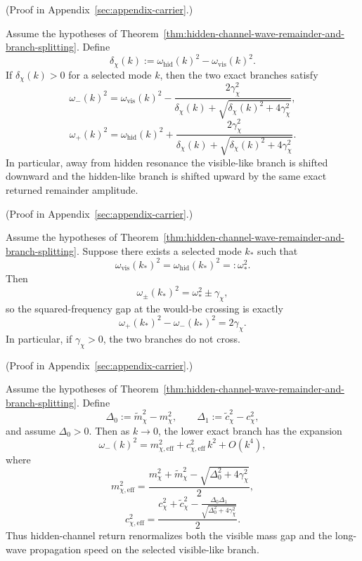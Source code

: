 (Proof in Appendix~\ref{sec:appendix-carrier}.)

\begin{corollary}
\label{cor:exact-off-resonant-hidden-channel-branch-shifts}
Assume the hypotheses of
Theorem~\ref{thm:hidden-channel-wave-remainder-and-branch-splitting}. Define
\[
\delta_{\chi}(k)
:=
\omega_{\mathrm{hid}}(k)^2-\omega_{\mathrm{vis}}(k)^2.
\]
If \(\delta_{\chi}(k)>0\) for a selected mode \(k\), then the two exact
branches satisfy
\[
\omega_-(k)^2
=
\omega_{\mathrm{vis}}(k)^2
-
\frac{2\gamma_{\chi}^2}{
\delta_{\chi}(k)+\sqrt{\delta_{\chi}(k)^2+4\gamma_{\chi}^2}
},
\]
\[
\omega_+(k)^2
=
\omega_{\mathrm{hid}}(k)^2
+
\frac{2\gamma_{\chi}^2}{
\delta_{\chi}(k)+\sqrt{\delta_{\chi}(k)^2+4\gamma_{\chi}^2}
}.
\]
In particular, away from hidden resonance the visible-like branch is shifted
downward and the hidden-like branch is shifted upward by the same exact
returned remainder amplitude.
\end{corollary}

(Proof in Appendix~\ref{sec:appendix-carrier}.)

\begin{corollary}
\label{cor:exact-avoided-crossing-coupled-wave-branches}
Assume the hypotheses of
Theorem~\ref{thm:hidden-channel-wave-remainder-and-branch-splitting}. Suppose
there exists a selected mode \(k_\ast\) such that
\[
\omega_{\mathrm{vis}}(k_\ast)^2
=
\omega_{\mathrm{hid}}(k_\ast)^2
=:
\omega_\ast^2.
\]
Then
\[
\omega_{\pm}(k_\ast)^2=\omega_\ast^2\pm\gamma_{\chi},
\]
so the squared-frequency gap at the would-be crossing is exactly
\[
\omega_+(k_\ast)^2-\omega_-(k_\ast)^2=2\gamma_{\chi}.
\]
In particular, if \(\gamma_{\chi}>0\), the two branches do not cross.
\end{corollary}

(Proof in Appendix~\ref{sec:appendix-carrier}.)

\begin{corollary}
\label{cor:low-energy-renormalized-mass-and-wave-speed-hidden-channel}
Assume the hypotheses of
Theorem~\ref{thm:hidden-channel-wave-remainder-and-branch-splitting}. Define
\[
\Delta_0:=\widetilde m_{\chi}^2-m_{\chi}^2,
\qquad
\Delta_1:=\widetilde c_{\chi}^2-c_{\chi}^2,
\]
and assume \(\Delta_0>0\). Then as \(k\to 0\), the lower exact branch has the
expansion
\[
\omega_-(k)^2
=
m_{\chi,\mathrm{eff}}^2
+
c_{\chi,\mathrm{eff}}^2\,k^2
+
O(k^4),
\]
where
\[
m_{\chi,\mathrm{eff}}^2
=
\frac{
m_{\chi}^2+\widetilde m_{\chi}^2
-\sqrt{\Delta_0^2+4\gamma_{\chi}^2}
}{2},
\]
\[
c_{\chi,\mathrm{eff}}^2
=
\frac{
c_{\chi}^2+\widetilde c_{\chi}^2
-\frac{\Delta_0\Delta_1}{\sqrt{\Delta_0^2+4\gamma_{\chi}^2}}
}{2}.
\]
Thus hidden-channel return renormalizes both the visible mass gap and the
long-wave propagation speed on the selected visible-like branch.
\end{corollary}

